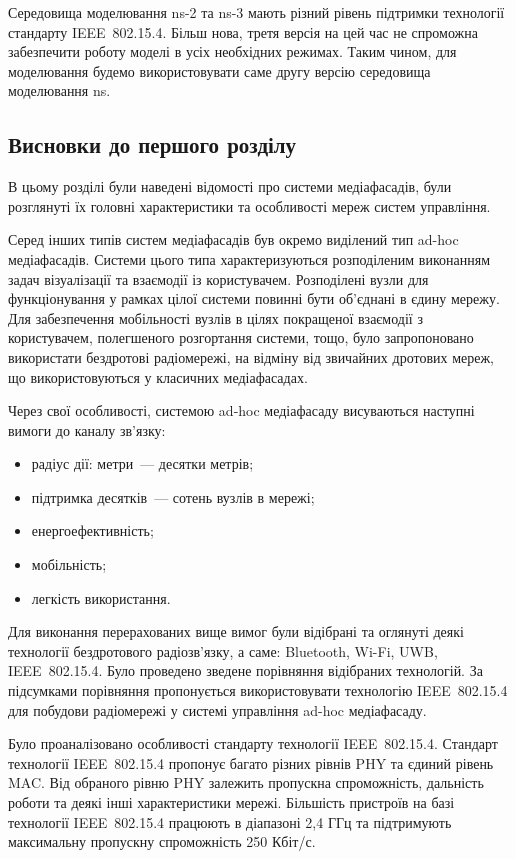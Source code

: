 \documentclass[a4paper,ukrainian,utf8,nocolumnsxix,floatsection,equationsection]{eskdtext}
\newcommand{\iee}[0]{IEEE~802.15.4\xspace}
\begin{document}
Середовища моделювання ns-2 та ns-3 мають різний рівень підтримки технології стандарту \iee. Більш нова, третя версія на цей час не спроможна забезпечити роботу моделі в усіх необхідних режимах. Таким чином, для моделювання будемо використовувати саме другу версію середовища моделювання ns.


\subsection{Висновки до першого розділу}

В цьому розділі були наведені відомості про системи медіафасадів, були розглянуті їх головні характеристики та особливості мереж систем управління.

Серед інших типів систем медіафасадів був окремо виділений тип ad-hoc медіафасадів. Системи цього типа характеризуються розподіленим виконанням задач візуалізації та взаємодії із користувачем. Розподілені вузли для функціонування у рамках цілої системи повинні бути об'єднані в єдину мережу. Для забезпечення мобільності вузлів в цілях покращеної взаємодії з користувачем, полегшеного розгортання системи, тощо, було запропоновано використати бездротові радіомережі, на відміну від звичайних дротових мереж, що використовуються у класичних медіафасадах.

Через свої особливості, системою ad-hoc медіафасаду висуваються наступні вимоги до каналу зв'язку:
\begin{itemize}
	\item радіус дії: метри~--- десятки метрів;
	\item підтримка десятків~--- сотень вузлів в мережі;
	\item енергоефективність;
	\item мобільність;
	\item легкість використання.
\end{itemize}

Для виконання перерахованих вище вимог були відібрані та оглянуті деякі технології бездротового радіозв'язку, а саме: Bluetooth, Wi-Fi, UWB, \iee. Було проведено зведене порівняння відібраних технологій. За підсумками порівняння пропонується використовувати технологію \iee для побудови радіомережі у системі управління ad-hoc медіафасаду. 

Було проаналізовано особливості стандарту технології \iee. Стандарт технології \iee пропонує багато різних рівнів PHY та єдиний рівень MAC. Від обраного рівню PHY залежить пропускна спроможність, дальність роботи та деякі інші характеристики мережі. Більшість пристроїв на базі технології \iee працюють в діапазоні 2,4 ГГц та підтримують максимальну пропускну спроможність 250 Кбіт/с. 
\end{document}
